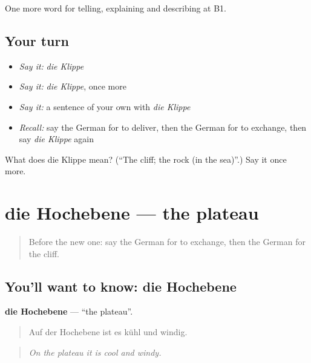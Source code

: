 \begin{grammarlens}[title={What you've built}]
One more word for telling, explaining and describing at B1.
\end{grammarlens}

\subsection*{Your turn}
\begin{itemize}
\raggedright
  \item \emph{Say it:} \emph{die Klippe}
  \item \emph{Say it:} \emph{die Klippe}, once more
  \item \emph{Say it:} a sentence of your own with \emph{die Klippe}
  \item \emph{Recall:} say the German for to deliver, then the German for to exchange, then say \emph{die Klippe} again
\end{itemize}

\begin{tcolorbox}[breakable,colback=teal!4,colframe=teal!35!black,title={Before you move on}]
What does die Klippe mean? (\textquotedblleft{}The cliff; the rock (in the sea)\textquotedblright{}.) Say it once more.
\end{tcolorbox}
\section[die Hochebene]{die Hochebene — the plateau}

\label{lesson:GE-C453-hochebene}



\begin{quote}
Before the new one: say the German for to exchange, then the German for the cliff.
\end{quote}

\subsection*{You'll want to know: die Hochebene}
\textbf{die Hochebene} — \textquotedblleft{}the plateau\textquotedblright{}.

\begin{quote}
Auf der Hochebene ist es kühl und windig.
\end{quote}

\begin{quote}
\emph{On the plateau it is cool and windy.}
\end{quote}

